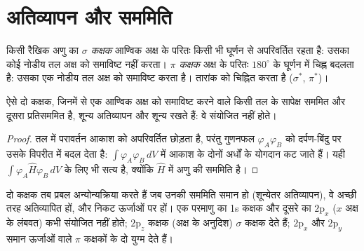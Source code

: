 \section{अतिव्यापन और सममिति}

\begin{definition}[$\sigma$ और $\pi$ कक्षक]\label{def:b2:diatomic-mos:sigma-pi}
किसी रैखिक अणु का \emph{$\sigma$ कक्षक} आण्विक अक्ष के परितः किसी भी
घूर्णन से अपरिवर्तित रहता है: उसका कोई नोडीय तल अक्ष को समाविष्ट नहीं करता।
\emph{$\pi$ कक्षक} अक्ष के परितः $180^\circ$ के घूर्णन में चिह्न बदलता है:
उसका एक नोडीय तल अक्ष को समाविष्ट करता है। तारांक  को चिह्नित करता है ($\sigma^*$, $\pi^*$)।
\end{definition}

\begin{proposition}[सममिति से शून्य अतिव्यापन]\label{prop:b2:diatomic-mos:symmetry}
ऐसे दो कक्षक, जिनमें से एक आण्विक अक्ष को समाविष्ट करने वाले किसी तल के सापेक्ष सममित और
दूसरा प्रतिसममित है, शून्य अतिव्यापन और शून्य  रखते हैं: वे संयोजित नहीं होते।
\end{proposition}

\begin{proof}
तल में परावर्तन आकाश को अपरिवर्तित छोड़ता है, परंतु गुणनफल
$\varphi_A\varphi_B$ को दर्पण-बिंदु पर उसके विपरीत में बदल देता है: $\int\varphi_A\varphi_B\,dV$ में
आकाश के दोनों अर्धों के योगदान कट जाते हैं। यही
$\int\varphi_A\hat H\varphi_B\,dV$ के लिए भी सत्य है, क्योंकि $\hat H$ में अणु की सममिति है।
\end{proof}

दो कक्षक तब प्रबल अन्योन्यक्रिया करते हैं जब उनकी सममिति समान हो (शून्येतर
अतिव्यापन), वे अच्छी तरह अतिव्यापित हों, और निकट ऊर्जाओं पर हों। एक परमाणु का 1s कक्षक और
दूसरे का $2\mathrm p_x$ ($x$ अक्ष के लंबवत) कभी संयोजित नहीं होते;
$2\mathrm p_z$ कक्षक (अक्ष के अनुदिश) $\sigma$ कक्षक देते हैं; $2\mathrm p_x$ और
$2\mathrm p_y$ समान ऊर्जाओं वाले $\pi$ कक्षकों के दो युग्म देते हैं।

